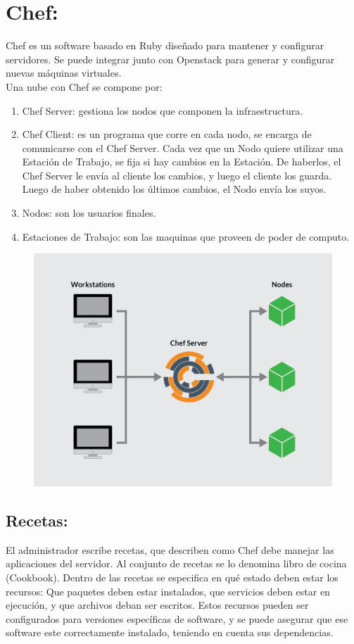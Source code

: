 \documentclass[12pt,letterpaper]{article}
\begin{document}
\section {Chef:}
Chef es un software basado en Ruby diseñado para mantener y configurar servidores. Se puede integrar junto con Openstack para generar y configurar nuevas máquinas virtuales.
\\Una nube con Chef se compone por: 
\begin{enumerate}
\item Chef Server: gestiona los nodos que componen la infraestructura.
\item Chef Client: es un programa que corre en cada nodo, se encarga de comunicarse con el Chef Server. Cada vez que un Nodo quiere utilizar una Estación de Trabajo, se fija si hay cambios en la Estación. De haberlos, el Chef Server le envía al cliente los cambios, y luego el cliente los guarda. Luego de haber obtenido los últimos cambios, el Nodo envía los suyos.
\item Nodos: son los usuarios finales.
\item Estaciones de Trabajo: son las maquinas que proveen de poder de computo.
\end{enumerate}

\begin{figure}[h]
\centering
\includegraphics[width=1\textwidth]{chef-graph.png}
\end{figure}

\subsection{Recetas:}
El administrador escribe recetas, que describen como Chef debe manejar las aplicaciones del servidor. Al conjunto de recetas se lo denomina libro de cocina (Cookbook). Dentro de las recetas se especifica en qué estado deben estar los recursos: Que paquetes deben estar instalados, que servicios deben estar en ejecución, y que archivos deban ser escritos. Estos recursos pueden ser configurados para versiones específicas de software, y se puede asegurar que ese software este correctamente instalado, teniendo en cuenta sus dependencias.
\end{document}
